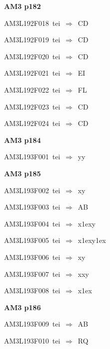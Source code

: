\par\vfill\eject
{\bf\hfill AM3 p182\hfill\hbox{}}\par\bigskip
{\sixrm AM3L192F018\ {\sixit tei}\ }$\Rightarrow$\ CD\par\smallskip
{\sixrm AM3L192F019\ {\sixit tei}\ }$\Rightarrow$\ CD\par\smallskip
{\sixrm AM3L192F020\ {\sixit tei}\ }$\Rightarrow$\ CD\par\smallskip
{\sixrm AM3L192F021\ {\sixit tei}\ }$\Rightarrow$\ EI\par\smallskip
{\sixrm AM3L192F022\ {\sixit tei}\ }$\Rightarrow$\ FL\par\smallskip
{\sixrm AM3L192F023\ {\sixit tei}\ }$\Rightarrow$\ CD\par\smallskip
{\sixrm AM3L192F024\ {\sixit tei}\ }$\Rightarrow$\ CD\par\smallskip

\par\vfill\eject
{\bf\hfill AM3 p184\hfill\hbox{}}\par\bigskip
{\sixrm AM3L193F001\ {\sixit tei}\ }$\Rightarrow$\ {\tenit yy}\par\smallskip

\par\vfill\eject
{\bf\hfill AM3 p185\hfill\hbox{}}\par\bigskip
{\sixrm AM3L193F002\ {\sixit tei}\ }$\Rightarrow$\ {\tenit xy}\par\smallskip
{\sixrm AM3L193F003\ {\sixit tei}\ }$\Rightarrow$\ AB\par\smallskip
{\sixrm AM3L193F004\ {\sixit tei}\ }$\Rightarrow$\ {\tenit x}\raise1ex\hbox{}{\tenit y}\par\smallskip
{\sixrm AM3L193F005\ {\sixit tei}\ }$\Rightarrow$\ {\tenit x}\raise1ex\hbox{}{\tenit y}\raise1ex\hbox{}\par\smallskip
{\sixrm AM3L193F006\ {\sixit tei}\ }$\Rightarrow$\ {\tenit xy}\par\smallskip
{\sixrm AM3L193F007\ {\sixit tei}\ }$\Rightarrow$\ {\tenit xxy}\par\smallskip
{\sixrm AM3L193F008\ {\sixit tei}\ }$\Rightarrow$\ {\tenit x}\raise1ex\hbox{}\par\smallskip

\par\vfill\eject
{\bf\hfill AM3 p186\hfill\hbox{}}\par\bigskip
{\sixrm AM3L193F009\ {\sixit tei}\ }$\Rightarrow$\ AB\par\smallskip
{\sixrm AM3L193F010\ {\sixit tei}\ }$\Rightarrow$\ RQ\par\smallskip

